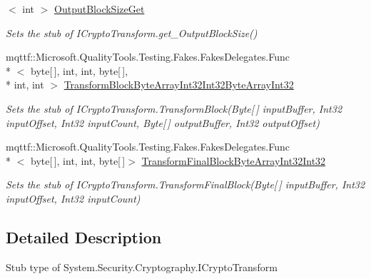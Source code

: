 \begin{DoxyCompactItemize}
$<$ int $>$ \hyperlink{class_system_1_1_security_1_1_cryptography_1_1_fakes_1_1_stub_i_crypto_transform_a41d55cc76154fceb3b308f6c9cc290c6}{Output\-Block\-Size\-Get}
\begin{DoxyCompactList}\small\item\em Sets the stub of I\-Crypto\-Transform.\-get\-\_\-\-Output\-Block\-Size()\end{DoxyCompactList}\item 
mqttf\-::\-Microsoft.\-Quality\-Tools.\-Testing.\-Fakes.\-Fakes\-Delegates.\-Func\\*
$<$ byte\mbox{[}$\,$\mbox{]}, int, int, byte\mbox{[}$\,$\mbox{]}, \\*
int, int $>$ \hyperlink{class_system_1_1_security_1_1_cryptography_1_1_fakes_1_1_stub_i_crypto_transform_ae4f9f606399cac6537440f5fbdb57b78}{Transform\-Block\-Byte\-Array\-Int32\-Int32\-Byte\-Array\-Int32}
\begin{DoxyCompactList}\small\item\em Sets the stub of I\-Crypto\-Transform.\-Transform\-Block(\-Byte\mbox{[}$\,$\mbox{]} input\-Buffer, Int32 input\-Offset, Int32 input\-Count, Byte\mbox{[}$\,$\mbox{]} output\-Buffer, Int32 output\-Offset)\end{DoxyCompactList}\item 
mqttf\-::\-Microsoft.\-Quality\-Tools.\-Testing.\-Fakes.\-Fakes\-Delegates.\-Func\\*
$<$ byte\mbox{[}$\,$\mbox{]}, int, int, byte\mbox{[}$\,$\mbox{]}$>$ \hyperlink{class_system_1_1_security_1_1_cryptography_1_1_fakes_1_1_stub_i_crypto_transform_a17f94fb6631f245e6e41bb1ef4400cfb}{Transform\-Final\-Block\-Byte\-Array\-Int32\-Int32}
\begin{DoxyCompactList}\small\item\em Sets the stub of I\-Crypto\-Transform.\-Transform\-Final\-Block(\-Byte\mbox{[}$\,$\mbox{]} input\-Buffer, Int32 input\-Offset, Int32 input\-Count)\end{DoxyCompactList}\end{DoxyCompactItemize}


\subsection{Detailed Description}
Stub type of System.\-Security.\-Cryptography.\-I\-Crypto\-Transform



